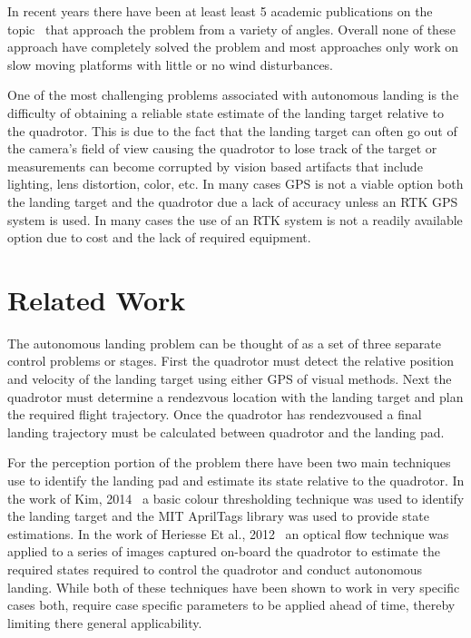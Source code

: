 \documentclass[letterpaper, 10 pt, conference]{ieeeconf}
\begin{document}
In recent years there have been at least least 5 academic publications on the
topic~\cite{Lee2012, Kim2014, Voos2010, Friis2009, Ling2014, Herisse2012} that
approach the problem from a variety of angles. Overall none of these approach
have completely solved the problem and most approaches only work on slow moving
platforms with little or no wind disturbances.

One of the most challenging problems associated with autonomous landing is the
difficulty of obtaining a reliable state estimate of the landing target
relative to the quadrotor. This is due to the fact that the landing target can
often go out of the camera's field of view causing the quadrotor to lose track
of the target or measurements can become corrupted by vision based artifacts
that include lighting, lens distortion, color, etc. In many cases GPS is not a
viable option both the landing target and the quadrotor due a lack of accuracy
unless an RTK GPS system is used. In many cases the use of an RTK system is not
a readily available option due to cost and the lack of required equipment.

\section{Related Work}
The autonomous landing problem can be thought of as a set of three separate
control problems or stages. First the quadrotor must detect the relative
position and velocity of the landing target using either GPS of visual methods.
Next the quadrotor must determine a rendezvous location with the landing target
and plan the required flight trajectory. Once the quadrotor has rendezvoused a
final landing trajectory must be calculated between quadrotor and the landing
pad.

For the perception portion of the problem there have been two main techniques
use to identify the landing pad and estimate its state relative to the
quadrotor. In the work of Kim, 2014~\cite{Kim2014} a basic colour thresholding
technique was used to identify the landing target and the MIT AprilTags library
\cite{apriltags} was used to provide state estimations. In the work of Heriesse
Et al., 2012~\cite{Herisse2012} an optical flow technique was applied to a
series of images captured on-board the quadrotor to estimate the required
states required to control the quadrotor and conduct autonomous landing. While
both of these techniques have been shown to work in very specific cases both,
require case specific parameters to be applied ahead of time, thereby limiting
there general applicability.
\end{document}
